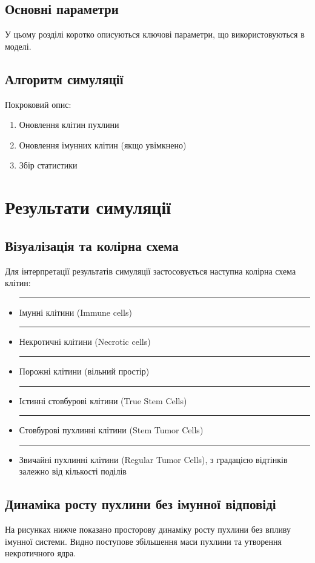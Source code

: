 \documentclass{article}
\begin{document}
\subsection{Основні параметри}

У цьому розділі коротко описуються ключові параметри, що використовуються в моделі.

\subsection{Алгоритм симуляції}
Покроковий опис:
\begin{enumerate}
    \item Оновлення клітин пухлини
    \item Оновлення імунних клітин (якщо увімкнено)
    \item Збір статистики
\end{enumerate}

\section{Результати симуляції}

\subsection{Візуалізація та колірна схема}

Для інтерпретації результатів симуляції застосовується наступна колірна схема клітин:

\begin{itemize}
    \item \textcolor{blue}{\rule{1em}{1em}} Імунні клітини (Immune cells)
    \item \textcolor{orange}{\rule{1em}{1em}} Некротичні клітини (Necrotic cells)
    \item \textcolor{gray}{\rule{1em}{1em}} Порожні клітини (вільний простір)
    \item \textcolor{yellow}{\rule{1em}{1em}} Істинні стовбурові клітини (True Stem Cells)
    \item \textcolor{green}{\rule{1em}{1em}} Стовбурові пухлинні клітини (Stem Tumor Cells)
    \item \textcolor{red}{\rule{1em}{1em}} Звичайні пухлинні клітини (Regular Tumor Cells), з градацією відтінків залежно від кількості поділів
\end{itemize}

\subsection{Динаміка росту пухлини без імунної відповіді}
На рисунках нижче показано просторову динаміку росту пухлини без впливу імунної системи. Видно поступове збільшення маси пухлини та утворення некротичного ядра.
\end{document}
